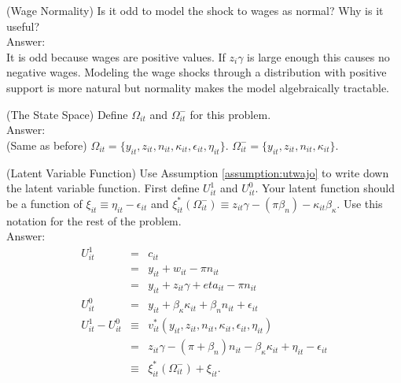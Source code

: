 \begin{exercise} (Wage Normality)
Is it odd to model the shock to wages as normal? Why is it useful?\\
\noindent Answer:\\
\noindent It is odd because wages are positive values. If $z_{i} \gamma$ is large enough this causes no negative wages. Modeling the wage shocks through a distribution with positive support is more natural but normality makes the model algebraically tractable. 
\end{exercise}

\begin{exercise} (The State Space)
Define $\Omega_{it}$ and $\Omega_{it}^-$ for this problem.\\
\noindent Answer:\\
\noindent (Same as before) $\Omega_{it} = \{ y_{it}, z_{it}, n_{it}, \kappa_{it}, \epsilon_{it}, \eta_{it} \}$. $\Omega_{it}^{-} = \{ y_{it}, z_{it}, n_{it}, \kappa_{it} \}$. 
\end{exercise}

\begin{exercise} (Latent Variable Function)
Use Assumption \ref{assumption:utwajo} to write down the latent variable function. First define $U_{it}^1$ and $U_{it}^0$. Your latent function should be a function of $\xi_{it} \equiv \eta_{it} - \epsilon_{it}$ and  $\xi_{it}^*\left( \Omega_{it}^- \right) \equiv z_{it} \gamma - \left( \pi \beta_{n} \right) - \kappa_{it} \beta_{\kappa}$. Use this notation for the rest of the problem.\\
\noindent Answer:\\
\begin{eqnarray}
U_{it}^{1} &=& c_{it} \nonumber \\
           &=& y_{it} + w_{it} - \pi n_{it} \nonumber \\
           &=& y_{it} + z_{it} \gamma + eta_{it} - \pi n_{it} \\
U_{it}^{0} &=& y_{it} + \beta_{\kappa} \kappa_{it} + \beta_{n} n_{it} + \epsilon_{it} \\
U_{it}^{1} - U_{it}^{0} &\equiv& v_{it}^{*} \left( y_{it}, z_{it}, n_{it}, \kappa_{it}, \epsilon_{it}, \eta_{it}  \right) \nonumber \\ 
           &=& z_{it} \gamma - \left( \pi + \beta_{n} \right) n_{it} - \beta_{\kappa} \kappa_{it} + \eta_{it} - \epsilon_{it} \nonumber \\
           & \equiv & \xi_{it}^{*} \left( \Omega_{it}^{-} \right) + \xi_{it}.
\end{eqnarray}
\end{exercise}

